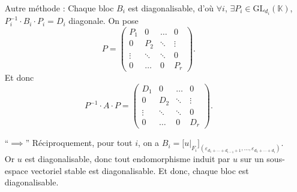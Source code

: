 \begin{exo}
\begin{itemize}
			Autre méthode :
			Chaque bloc $B_i$\/ est diagonalisable, d'où $\forall i$, $\exists P_i \in \mathrm{GL}_{d_i}(\mathds{K})$, $P_i^{-1}\cdot B_i \cdot P_i = D_i$\/ diagonale.
			On pose \[
				P =
				\left(\begin{array}{c|c|c|c}
						P_1&0&\ldots&0\\ \hline
						0&P_2&\ddots&\vdots\\ \hline
						\vdots&\ddots&\ddots&0\\ \hline
						0&\ldots&0&P_r
				\end{array}\right)
			.\]
			Et donc \[
				P^{-1}\cdot A \cdot P = \left( 
				\begin{array}{c|c|c|c}
					D_1&0&\ldots&0\\ \hline
					0&D_2&\ddots&\vdots\\ \hline
					\vdots&\ddots&\ddots&0\\ \hline
					0&\ldots&0&D_r
				\end{array}\right)
			.\]
		\item[``$\implies$'']
			Réciproquement, pour tout $i$, on a $B_i = \Big[u\big|_{F_i}\Big]_{(\varepsilon_{d_1 + \cdots + d_{i-1} + 1},\ldots,\varepsilon_{d_1 + \cdots + d_i})}$.\\
			Or $u$\/ est diagonalisable, donc tout endomorphisme induit par $u$\/ sur un sous-espace vectoriel stable est diagonalisable. Et donc, chaque bloc est diagonalisable.
	\end{itemize}
\end{exo}


